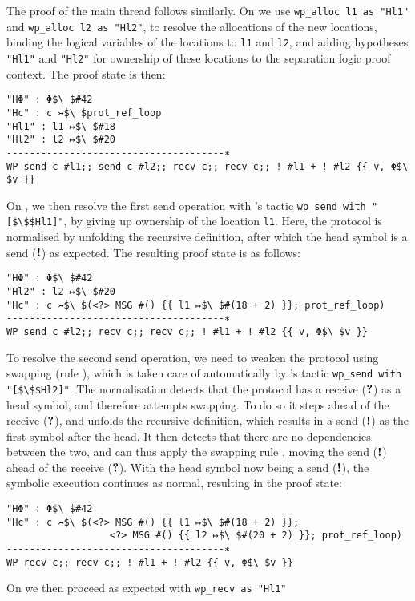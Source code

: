 The proof of the main thread follows similarly.
On  we use \lstinline{wp_alloc l1 as "Hl1"} and
\lstinline{wp_alloc l2 as "Hl2"}, to resolve the allocations of the new locations,
binding the logical variables of the locations to \lstinline{l1} and \lstinline{l2},
and adding hypotheses \lstinline{"Hl1"} and \lstinline{"Hl2"} for ownership
of these locations to the separation logic proof context.
The proof state is then:
\begin{lstlisting}
"HΦ" : Φ$\ $#42
"Hc" : c ↣$\ $prot_ref_loop
"Hl1" : l1 ↦$\ $#18
"Hl2" : l2 ↦$\ $#20
--------------------------------------∗
WP send c #l1;; send c #l2;; recv c;; recv c;; ! #l1 + ! #l2 {{ v, Φ$\ $v }}
\end{lstlisting}
On ,
we then resolve the first send operation with \lname's tactic
\lstinline{wp_send with "[$\$$Hl1]"}, by giving up
ownership of the location \lstinline|l1|.
Here, the protocol is normalised by unfolding the recursive definition, after which the
head symbol is a send ($\textnormal{\bf !}$) as expected.
The resulting proof state is as follows:
\begin{lstlisting}
"HΦ" : Φ$\ $#42
"Hl2" : l2 ↦$\ $#20
"Hc" : c ↣$\ $(<?> MSG #() {{ l1 ↦$\ $#(18 + 2) }}; prot_ref_loop)
--------------------------------------∗
WP send c #l2;; recv c;; recv c;; ! #l1 + ! #l2 {{ v, Φ$\ $v }}
\end{lstlisting}
To resolve the second send operation, we need to weaken the protocol using swapping
(rule ), which is taken care of automatically by \lname's tactic
\lstinline{wp_send with "[$\$$Hl2]"}.
The normalisation detects that the protocol has a
receive ($\textnormal{\bf ?}$) as a head symbol, and therefore attempts swapping.
To do so it steps ahead of the receive ($\textnormal{\bf ?}$), and unfolds the recursive definition,
which results in a send ($\textnormal{\bf !}$) as the first symbol after the head.
It then detects that there are no dependencies between the two, and can thus apply
the swapping rule , moving the send ($\textnormal{\bf !}$) ahead of the
receive ($\textnormal{\bf ?}$).
With the head symbol now being a send ($\textnormal{\bf !}$), the symbolic execution continues as normal,
resulting in the proof state:
\begin{lstlisting}
"HΦ" : Φ$\ $#42
"Hc" : c ↣$\ $(<?> MSG #() {{ l1 ↦$\ $#(18 + 2) }};
                  <?> MSG #() {{ l2 ↦$\ $#(20 + 2) }}; prot_ref_loop)
--------------------------------------∗
WP recv c;; recv c;; ! #l1 + ! #l2 {{ v, Φ$\ $v }}
\end{lstlisting}
On  we then proceed as expected with \lstinline{wp_recv as "Hl1"}
